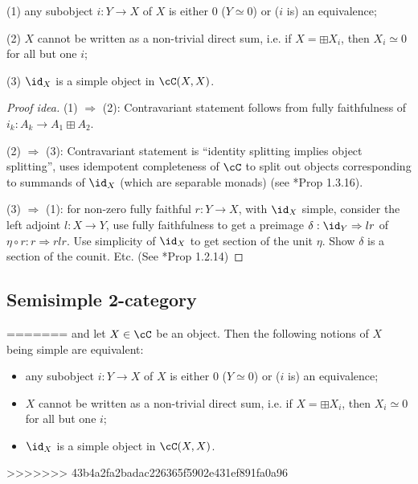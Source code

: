 \documentclass[12pt]{article}
\begin{document}
\begin{proposition}
\begin{proposition}
(1) any subobject $i: Y \to X$ of $X$
 is either 0 ($Y \simeq 0$)
 or ($i$ is) an equivalence;

(2) $X$ cannot be written as a non-trivial direct sum,
	i.e. if $X = \boxplus X_i$,
	then $X_i \simeq 0$ for all but one $i$;

(3) $\id_X$ is a simple object in $\cC(X,X)$.
\end{proposition}

\begin{proof}[Proof idea]
(1) $\Rightarrow$ (2): Contravariant statement
follows from fully faithfulness of
$i_k: A_k \to A_1 \boxplus A_2$.

(2) $\Rightarrow$ (3): Contravariant statement is
``identity splitting implies object splitting'',
uses idempotent completeness of $\cC$
to split out objects corresponding to summands of $\id_X$
(which are separable monads)
(see \cite{DRfusion}*{Prop 1.3.16}).

(3) $\Rightarrow$ (1): for non-zero fully faithful $r: Y \to X$,
with $\id_X$ simple,
consider the left adjoint $l: X \to Y$,
use fully faithfulness to get a preimage
$\delta : \id_Y \Rightarrow lr$ of
$\eta \circ r: r \Rightarrow rlr$.
Use simplicity of $\id_X$ to get section of the unit $\eta$.
Show $\delta$ is a section of the counit. Etc.
(See \cite{DRfusion}*{Prop 1.2.14})
\end{proof}


\subsection{Semisimple 2-category}

=======
and let $X \in \cC$ be an object.
Then the following notions of $X$ being simple are equivalent:
\begin{itemize}
\item any subobject $i: Y \to X$ of $X$
 is either 0 ($Y \simeq 0$)
 or ($i$ is) an equivalence;

\item $X$ cannot be written as a non-trivial direct sum,
	i.e. if $X = \boxplus X_i$,
	then $X_i \simeq 0$ for all but one $i$;

\item $\id_X$ is a simple object in $\cC(X,X)$.
\end{itemize}
\end{proposition}

>>>>>>> 43b4a2fa2badac226365f5902e431ef891fa0a96
\end{document}
